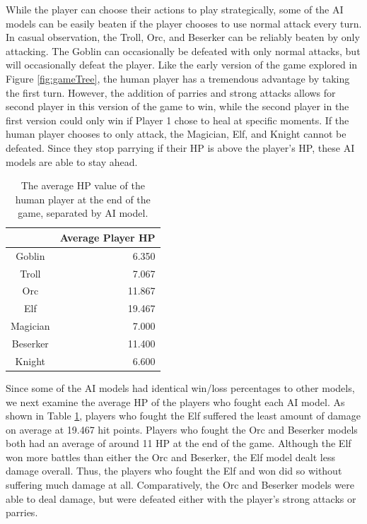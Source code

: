 While the player can choose their actions to play strategically, some of the AI models can be easily beaten if the player chooses to use normal attack every turn. In casual observation, the Troll, Orc, and Beserker can be reliably beaten by only attacking. The Goblin can occasionally be defeated with only normal attacks, but will occasionally defeat the player. Like the early version of the game explored in Figure \ref{fig:gameTree}, the human player has a tremendous advantage by taking the first turn. However, the addition of parries and strong attacks allows for second player in this version of the game to win, while the second player in the first version could only win if Player 1 chose to heal at specific moments. If the human player chooses to only attack, the Magician, Elf, and Knight cannot be defeated. Since they stop parrying if their HP is above the player's HP, these AI models are able to stay ahead.

\begin{table}[htbp]
  \centering
  \begin{tabular}{|c r|}
    \toprule
    \rowcolor[rgb]{ 0,  0,  0} \multicolumn{1}{|l}{\textcolor[rgb]{ 1,  1,  1}{\textbf{AI Model}}} & \textcolor[rgb]{ 1,  1,  1}{\textbf{Average Player HP}}\\
    \midrule
    \rowcolor[rgb]{ .851, .851, .851} Goblin & 6.350 \\
    \midrule
    Troll & 7.067 \\
    \midrule
    \rowcolor[rgb]{ .851, .851, .851} Orc & 11.867 \\
    \midrule
    Elf & 19.467 \\
    \midrule
    \rowcolor[rgb]{ .851, .851, .851} Magician & 7.000 \\
    \midrule
    Beserker & 11.400 \\
    \midrule
    \rowcolor[rgb]{ .851, .851, .851} Knight & 6.600 \\
    \bottomrule
  \end{tabular}
  \caption{The average HP value of the human player at the end of the game, separated by AI model.}
  \label{tab:avgHP}
\end{table}
Since some of the AI models had identical win/loss percentages to other models, we next examine the average HP of the players who fought each AI model. As shown in Table \ref{tab:avgHP}, players who fought the Elf suffered the least amount of damage on average at 19.467 hit points. Players who fought the Orc and Beserker models both had an average of around 11 HP at the end of the game. Although the Elf won more battles than either the Orc and Beserker, the Elf model dealt less damage overall. Thus, the players who fought the Elf and won did so without suffering much damage at all. Comparatively, the Orc and Beserker models were able to deal damage, but were defeated either with the player's strong attacks or parries.\\

